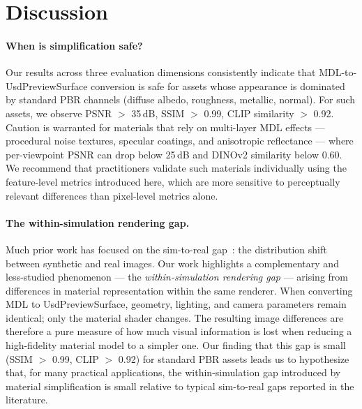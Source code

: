 \section{Discussion}
\label{sec:discussion}

\paragraph{When is simplification safe?}
Our results across three evaluation dimensions consistently indicate that
MDL-to-UsdPreviewSurface conversion is safe for assets whose appearance is
dominated by standard PBR channels (diffuse albedo, roughness, metallic,
normal). For such assets, we observe PSNR $>$ 35\,dB, SSIM $>$ 0.99, CLIP
similarity $>$ 0.92. Caution is
warranted for materials that rely on multi-layer MDL effects --- procedural
noise textures, specular coatings, and anisotropic reflectance --- where
per-viewpoint PSNR can drop below 25\,dB and DINOv2 similarity below 0.60. We
recommend that practitioners validate such materials individually using the
feature-level metrics introduced here, which are more sensitive to perceptually
relevant differences than pixel-level metrics alone.

\paragraph{The within-simulation rendering gap.}
Much prior work has focused on the sim-to-real
gap~\cite{Tobin2017Domain,Tremblay2018Training,Zhao2020Sim,Garcia2023Robust}:
the distribution shift between synthetic and real images. Our work highlights a
complementary and less-studied phenomenon --- the \emph{within-simulation
rendering gap} --- arising from differences in material representation within
the same renderer. When converting MDL to UsdPreviewSurface, geometry, lighting,
and camera parameters remain identical; only the material shader changes. The
resulting image differences are therefore a pure measure of how much visual
information is lost when reducing a high-fidelity material model to a simpler
one. Our finding that this gap is small (SSIM $>$ 0.99, CLIP $>$ 0.92) for
standard PBR assets leads us to hypothesize that, for many practical
applications, the within-simulation gap introduced by material simplification
is small relative to typical sim-to-real gaps reported in the literature.

